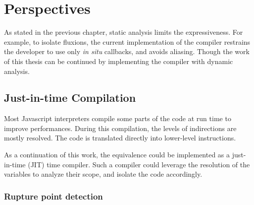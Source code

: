 




\section{Perspectives} \label{chapter5:evaluation:perspective}

As stated in the previous chapter, static analysis limits the expressiveness.
For example, to isolate fluxions, the current implementation of the compiler restrains the developer to use only \textit{in situ} callbacks, and avoids aliasing.
Though the work of this thesis can be continued by implementing the compiler with dynamic analysis.

\subsection{Just-in-time Compilation}

Most Javascript interpreters compile some parts of the code at run time to improve performances.
During this compilation, the levels of indirections are mostly resolved.
The code is translated directly into lower-level instructions.

As a continuation of this work, the equivalence could be implemented as a just-in-time (JIT) time compiler.
Such a compiler could leverage the resolution of the variables to analyze their scope, and isolate the code accordingly.

\subsubsection{Rupture point detection}

